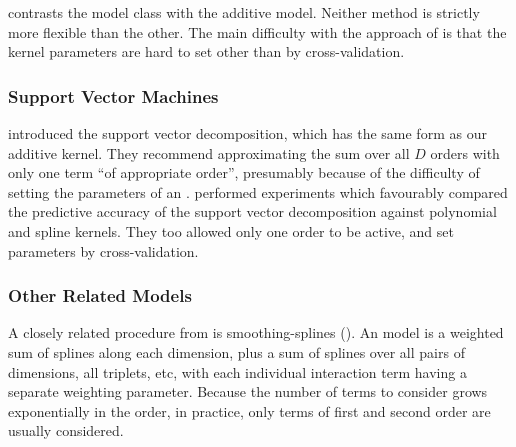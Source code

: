  contrasts the \HKL{} model class with the additive \gp{} model.
Neither method is strictly more flexible than the other.
The main difficulty with the approach of \citet{DBLP:journals/corr/abs-0909-0844} is that the kernel parameters are hard to set other than by cross-validation.



\subsubsection{Support Vector Machines}

\citet{vapnik1998statistical} introduced the support vector \ANOVA{} decomposition, which has the same form as our additive kernel.
They recommend approximating the sum over all $D$ orders with only one term ``of appropriate order'', presumably because of the difficulty of setting the parameters of an \SVM{}.
\citet{stitson1999support} performed experiments which favourably compared the predictive accuracy of the support vector \ANOVA{} decomposition against polynomial and spline kernels.
They too allowed only one order to be active, and set parameters by cross-validation.
%

\subsubsection{Other Related Models}

A closely related procedure from \citet{wahba1990spline} is smoothing-splines \ANOVA{} (\SSANOVA{}).
An \SSANOVA{} model is a weighted sum of splines along each dimension, plus a sum of splines over all pairs of dimensions, all triplets, etc, with each individual interaction term having a separate weighting parameter.
Because the number of terms to consider grows exponentially in the order, in practice, only terms of first and second order are usually considered.


